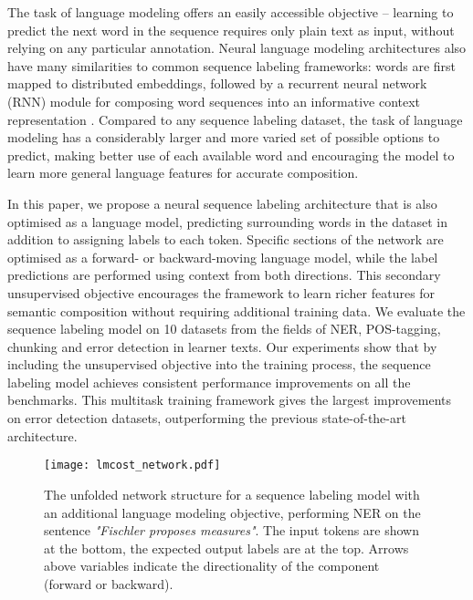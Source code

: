 \documentclass[11pt,a4paper]{article}
\begin{document}
The task of language modeling offers an easily accessible objective -- learning to predict the next word in the sequence requires only plain text as input, without relying on any particular annotation.
Neural language modeling architectures also have many similarities to common sequence labeling frameworks: words are first mapped to distributed embeddings, followed by a recurrent neural network (RNN) module for composing word sequences into an informative context representation \cite{Mikolov2010,Graves2013b,Chelba2014}.
Compared to any sequence labeling dataset, the task of language modeling has a considerably larger and more varied set of possible options to predict, making better use of each available word and encouraging the model to learn more general language features for accurate composition.


In this paper, we propose a neural sequence labeling architecture that is also optimised as a language model, predicting surrounding words in the dataset in addition to assigning labels to each token.
Specific sections of the network are optimised as a forward- or backward-moving language model, while the label predictions are performed using context from both directions. 
This secondary unsupervised objective encourages the framework to learn richer features for semantic composition without requiring additional training data.
We evaluate the sequence labeling model on 10 datasets from the fields of NER, POS-tagging, chunking and error detection in learner texts.
Our experiments show that by including the unsupervised objective into the training process, the sequence labeling model achieves consistent performance improvements on all the benchmarks.
This multitask training framework gives the largest improvements on error detection datasets, outperforming the previous state-of-the-art architecture.







\begin{figure*}[t]
	\texttt{[image: lmcost\_network.pdf]}
	\caption{The unfolded network structure for a sequence labeling model with an additional language modeling objective, performing NER on the sentence \textit{"Fischler proposes measures"}. The input tokens are shown at the bottom, the expected output labels are at the top. Arrows above variables indicate the directionality of the component (forward or backward).}
	\label{fig:network}
\end{figure*}
\end{document}

